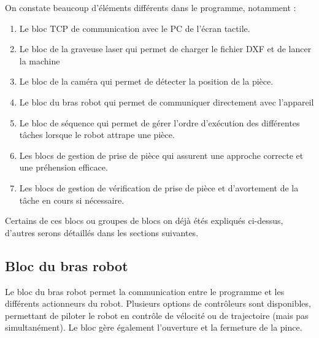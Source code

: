 On constate beaucoup d'éléments différents dans le programme, notamment :
\begin{enumerate}
    \item Le bloc TCP de communication avec le PC de l'écran tactile.
    \item Le bloc de la graveuse laser qui permet de charger le fichier DXF et de lancer la machine
    \item Le bloc de la caméra qui permet de détecter la position de la pièce.
    \item Le bloc du bras robot qui permet de communiquer directement avec l'appareil
    \item Le bloc de séquence qui permet de gérer l'ordre d'exécution des différentes tâches lorsque le robot attrape une pièce.
    \item Les blocs de gestion de prise de pièce qui assurent une approche correcte et une préhension efficace.
    \item Les blocs de gestion de vérification de prise de pièce et d'avortement de la tâche en cours si nécessaire.
\end{enumerate}

Certains de ces blocs ou groupes de blocs on déjà étés expliqués ci-dessus, d'autres serons détaillés dans les sections suivantes.

\subsection{Bloc du bras robot}

Le bloc du bras robot permet la communication entre le programme et les différents actionneurs du robot. Plusieurs options de contrôleurs sont disponibles, permettant de piloter le robot en contrôle de vélocité ou de trajectoire (mais pas simultanément). Le bloc gère également l'ouverture et la fermeture de la pince.

